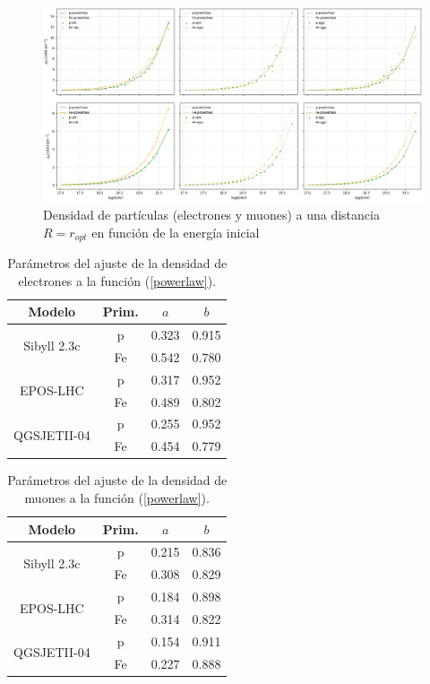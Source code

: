 \begin{figure}[h] 
\centering
\includegraphics[width=\textwidth]{Figuras/density_pFe}
\caption{Densidad de partículas (electrones y muones) a una distancia $R=r_{opt}$ en función de la energía inicial}
\label{fig:density}
\end{figure}

\begin{table}[] 
\centering
\caption{Parámetros del ajuste de la densidad de electrones a la función (\ref{powerlaw}).}
\begin{tabular}{c|c|cc}
Modelo                       & Prim. & $a$ & $b$   \\ \hline
\multirow{2}{*}{Sibyll 2.3c} & p     & 0.323     & 0.915 \\
                             & Fe    & 0.542     & 0.780 \\ \hline
\multirow{2}{*}{EPOS-LHC}    & p     & 0.317     & 0.952 \\
                             & Fe    & 0.489     & 0.802 \\ \hline
\multirow{2}{*}{QGSJETII-04} & p     & 0.255     & 0.952 \\
                             & Fe    & 0.454     & 0.779 \\ \hline
\end{tabular}
\label{edensity_params}
\end{table}

\begin{table}[] 
\centering
\caption{Parámetros del ajuste de la densidad de muones a la función (\ref{powerlaw}).}
\begin{tabular}{c|c|cc}
Modelo                       & Prim. & $a$ 		 & $b$   \\ \hline
\multirow{2}{*}{Sibyll 2.3c} & p     & 0.215     & 0.836 \\
                             & Fe    & 0.308     & 0.829 \\ \hline
\multirow{2}{*}{EPOS-LHC}    & p     & 0.184     & 0.898 \\
                             & Fe    & 0.314     & 0.822 \\ \hline
\multirow{2}{*}{QGSJETII-04} & p     & 0.154     & 0.911 \\
                             & Fe    & 0.227     & 0.888 \\ \hline
\end{tabular}
\label{mudensity_params}
\end{table}

